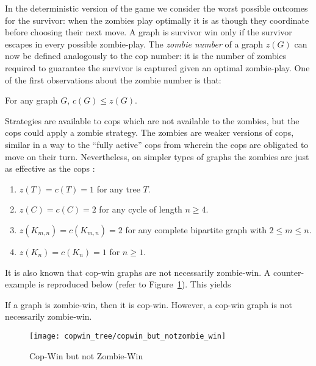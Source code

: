 In the deterministic version of the game we consider the worst possible outcomes for the survivor: when the zombies play optimally it is as though they coordinate before choosing their next move. A graph is survivor win only if the survivor escapes in every possible zombie-play.
The \textit{zombie number} of a graph $z(G)$ can now be defined analogously to the cop number: it is the number of zombies required to guarantee the survivor is captured given an optimal zombie-play.
One of the first observations \cite{fitzpatrick2016deterministic} about the zombie number is that:

\begin{lemma}
For any graph $G$, $c(G) \leq z(G)$.
\end{lemma}

Strategies are available to cops which are not available to the zombies, but the cops could apply a zombie strategy. The zombies are weaker versions of cops, similar in a way to the ``fully active'' cops from \cite{gromovikov2018fully} wherein the cops are obligated to move on their turn. Nevertheless, on simpler types of graphs the zombies are just as effective as the cops \cite{fitzpatrick2016deterministic}:

\begin{observation}
  \begin{enumerate}
    \item $z(T) = c(T) = 1$ for any tree $T$.
    \item $z(C) = c(C) = 2$ for any cycle of length $n \geq 4$.
    \item $z(K_{m,n}) = c(K_{m,n}) = 2$ for any complete bipartite graph with $2 \leq m \leq n$.
    \item $z(K_n) = c(K_n) = 1$ for $n \geq 1$.
  \end{enumerate}
\end{observation}

It is also known \cite{fitzpatrick2016deterministic} that cop-win graphs are not necessarily zombie-win. A counter-example  is reproduced below (refer to Figure~\ref{fig:copwin_but_notzombie_win}). This yields

\begin{theorem}
If a graph is zombie-win, then it is cop-win. However, a cop-win graph is not necessarily zombie-win.
\end{theorem}

\begin{figure}
\centering
\texttt{[image: copwin\_tree/copwin\_but\_notzombie\_win]}
\caption{Cop-Win but not Zombie-Win \label{fig:copwin_but_notzombie_win}}
\end{figure}

